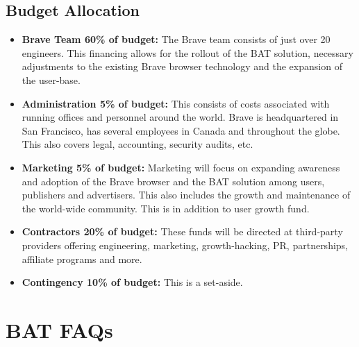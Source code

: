 \documentclass[11pt]{article}
\begin{document}
\subsection{Budget Allocation}
\label{sec-6-4}
\begin{itemize}
\item{\textbf{Brave Team 60\% of budget:} The Brave team consists of just over 20 engineers. This financing allows for the rollout of the BAT solution, necessary adjustments to the existing Brave browser technology and the expansion of the user-base.  }
\item{\textbf{Administration 5\% of budget:} This consists of costs associated with running offices and personnel around the world. Brave is headquartered in San Francisco, has several employees in Canada and throughout the globe. This also covers legal, accounting, security audits, etc. }
\item{\textbf{Marketing 5\% of budget:} Marketing will focus on expanding awareness and adoption of the Brave browser and the BAT solution among users, publishers and advertisers. This also includes the growth and maintenance of the world-wide community. This is in addition to user growth fund.}
\item{\textbf{Contractors 20\% of budget:} These funds will be directed at third-party providers offering engineering, marketing, growth-hacking, PR, partnerships, affiliate programs and more. }
\item{\textbf{Contingency 10\% of budget:} This is a set-aside. }
\end{itemize}

\section{BAT FAQs}
\label{sec-7}
\end{document}
